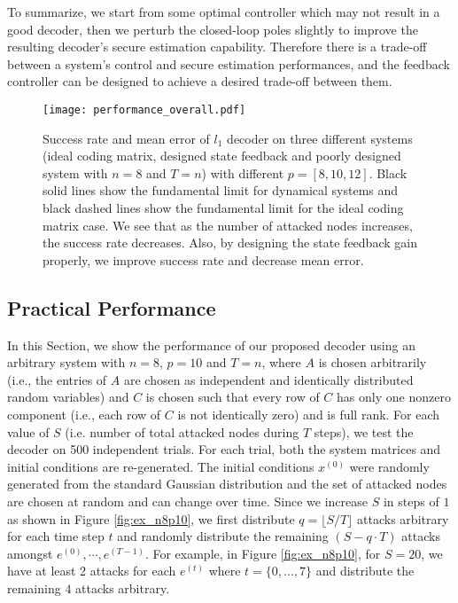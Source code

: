 \documentclass[journal]{IEEEtran}
\begin{document}
To summarize, we start from some optimal controller which may not result in a good decoder, then we perturb the closed-loop poles slightly to improve the resulting decoder's secure estimation capability. Therefore there is a trade-off between a system's control and secure estimation performances, and the feedback controller can be designed to achieve a desired trade-off between them.





\begin{figure}
\center
\texttt{[image: performance\_overall.pdf]}
\caption{Success rate and mean error of $l_1$ decoder on three different systems (ideal coding matrix, designed state feedback and poorly designed system with $n=8$ and $T=n$) with different $p=[8,10,12]$. Black solid lines show the fundamental limit for dynamical systems and black dashed lines show the fundamental limit for the ideal coding matrix case. We see that as the number of attacked nodes increases, the success rate decreases. Also, by designing the state feedback gain properly, we improve success rate and decrease mean error. }
\label{fig:ex_n8_overall}
\end{figure}





\subsection{Practical Performance}\label{sec:prac_perf}
In this Section, we show the performance of our proposed decoder using an arbitrary system with $n=8$, $p=10$ and $T=n$, where $A$ is chosen arbitrarily (i.e., the entries of $A$ are chosen as independent and identically distributed random variables) and $C$ is chosen such that every row of $C$ has only one nonzero component (i.e., each row of $C$ is not identically zero) and is full rank. 
For each value of $S$ (i.e. number of total attacked nodes during $T$ steps), we test the decoder on 500 independent trials. For each trial, both the system matrices and initial conditions are re-generated. The initial conditions $x^{(0)}$ were randomly generated from the standard Gaussian distribution and the set of attacked nodes are chosen at random and can change over time. Since we increase $S$ in steps of $1$ as shown in Figure \ref{fig:ex_n8p10}, we first distribute $q= \lfloor S/T \rfloor$ attacks arbitrary for each time step $t$ and randomly distribute the remaining $(S-q\cdot T)$ attacks amongst $e^{(0)},\cdots, e^{(T-1)}$. For example, in Figure \ref{fig:ex_n8p10}, for $S=20$, we have at least 2 attacks for each $e^{(t)}$ where $t=\{0,...,7\}$ and 
distribute the remaining $4$ attacks arbitrary. 
\end{document}
